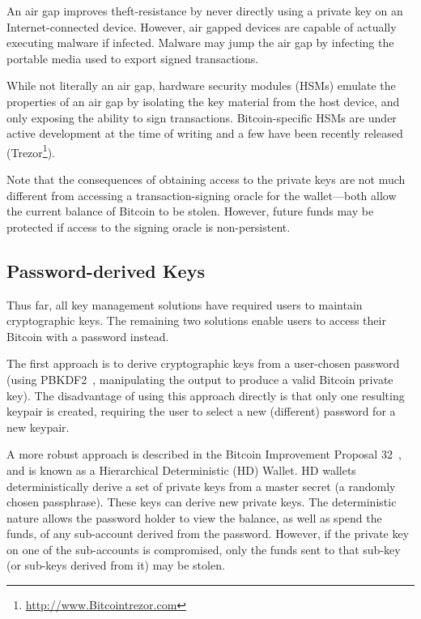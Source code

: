 An air gap improves theft-resistance by never directly using a private key on an Internet-connected device. However, air gapped devices are capable of actually executing malware if infected. Malware may jump the air gap by infecting the portable media used to export signed transactions.

While not literally an air gap, hardware security modules (HSMs) emulate the properties of an air gap by isolating the key material from the host device, and only exposing the ability to sign transactions. Bitcoin-specific HSMs are under active development at the time of writing and a few have been recently released (\eg Trezor\footnote{\url{http://www.Bitcointrezor.com}}).

Note that the consequences of obtaining access to the private keys are not much different from accessing a transaction-signing oracle for the wallet---both allow the current balance of Bitcoin to be stolen. However, future funds may be protected if access to the signing oracle is non-persistent. 

\subsection{Password-derived Keys} 
Thus far, all key management solutions have required users to maintain cryptographic keys. The remaining two solutions enable users to access their Bitcoin with a password instead. 

The first approach is to derive cryptographic keys from a user-chosen password (\eg using PBKDF2~\cite{pbkdf2}, manipulating the output to produce a valid Bitcoin private key). The disadvantage of using this approach directly is that only one resulting keypair is created, requiring the user to select a new (different) password for a new keypair. 

A more robust approach is described in the Bitcoin Improvement Proposal 32~\cite{bip32}, and is known as a Hierarchical Deterministic (HD) Wallet. HD wallets deterministically derive a set of private keys from a master secret (a randomly chosen passphrase). These keys can derive new private keys. The deterministic nature allows the password holder to view the balance, as well as spend the funds, of any sub-account derived from the password. However, if the private key on one of the sub-accounts is compromised, only the funds sent to that sub-key (or sub-keys derived from it) may be stolen. 


